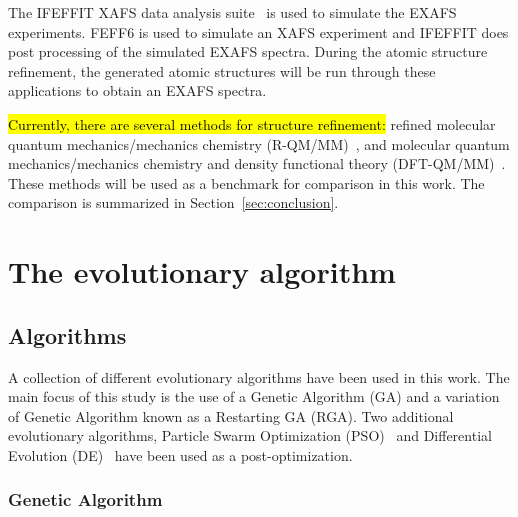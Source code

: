 \documentclass[conference]{IEEEtran}
\begin{document}
The IFEFFIT XAFS data analysis suite~\cite{ifeffit} is used to simulate the EXAFS experiments. FEFF6 is used to simulate an XAFS experiment and IFEFFIT does post processing of the simulated EXAFS spectra. During the atomic structure refinement, the generated atomic structures will be run through these applications to obtain an EXAFS spectra.

\hl{Currently, there are several methods for structure refinement:} refined molecular quantum mechanics/mechanics chemistry (R-QM/MM)~\cite{luber2011s1}, and molecular quantum mechanics/mechanics chemistry and density functional theory (DFT-QM/MM)~\cite{luber2011s1}. These methods will be used as a benchmark for comparison in this work. The comparison is summarized in Section~\ref{sec:conclusion}.


\section{The evolutionary algorithm}
\label{sec:evolutionaryAlgorithm}

\subsection{Algorithms}

A collection of different evolutionary algorithms have been used in this work. The main focus of this study is the use of a Genetic Algorithm (GA) and a variation of Genetic Algorithm known as a Restarting GA (RGA). Two additional evolutionary algorithms, Particle Swarm Optimization (PSO)~\cite{kennedy2010particle} and Differential Evolution (DE)~\cite{storn1997differential} have been used as a post-optimization.

\subsubsection{Genetic Algorithm}
\end{document}
